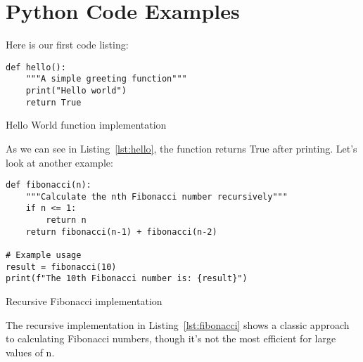 \documentclass{article}
\begin{document}
\section{Python Code Examples}

Here is our first code listing:

\begin{listing}
\begin{verbatim}
def hello():
    """A simple greeting function"""
    print("Hello world")
    return True
\end{verbatim}
\caption{Hello World function implementation}
\label{lst:hello}
\end{listing}

As we can see in Listing~\ref{lst:hello}, the function returns True after printing.
Let's look at another example:

\begin{listing}
\begin{verbatim}
def fibonacci(n):
    """Calculate the nth Fibonacci number recursively"""
    if n <= 1:
        return n
    return fibonacci(n-1) + fibonacci(n-2)

# Example usage
result = fibonacci(10)
print(f"The 10th Fibonacci number is: {result}")
\end{verbatim}
\caption{Recursive Fibonacci implementation}
\label{lst:fibonacci}
\end{listing}

The recursive implementation in Listing~\ref{lst:fibonacci} shows a classic
approach to calculating Fibonacci numbers, though it's not the most efficient
for large values of n.
\end{document}
